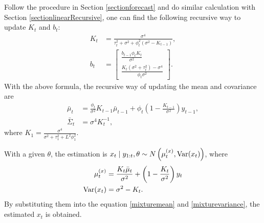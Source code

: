 Follow the procedure in Section \ref{sectionforecast} and do similar calculation with Section \ref{sectionlinearRecursive}, one can find the following recursive way to update $K_{t}$ and $b_{t}$: 
\begin{align} \label{linearOUKirreg}
K_{t}  &=\frac{\sigma^4}{\tau_t^2+\sigma^2+\phi_t^2(\sigma^2-K_{t-1})},\\
b_{t} &= \begin{bmatrix}
\frac{b_{t-1}\phi_t K_{t}}{\sigma^2} \\\label{linearOUbirreg} \frac{K_{t}(\sigma^2+\tau_t^2)-\sigma^4 }{\phi_t\sigma^2}
\end{bmatrix}. 
\end{align}
With the above formula, the recursive way of updating the mean and covariance are 
\begin{align} \label{linearOUmu}
\bar{\mu}_{t}       & = \frac{\phi_t}{\sigma^2}K_{t-1}\bar{\mu}_{t-1} + \phi_t \left(1 - \frac{K_{t-1}}{\sigma^2}\right)y_{t-1}, \\
\bar{\Sigma}_{t}  &= \sigma^4K_{t}^{-1}, \label{linearOUsigma}
\end{align}
where $K_1=\frac{\sigma^4}{\sigma^2+\tau_1^2+L^2\phi_1^2}$. 
%


With a given $\theta$, the estimation is $x_{t}\mid y_{1:t},\theta \sim N\left(\mu_{t}^{(x)},\mathrm{Var}(x_t)\right)$, where
\begin{align}\label{linearOUmean}
\mu_{t}^{(x)} &  =  \frac{K_{t}\bar{\mu}_{t}}{\sigma^2}+\left(1-\frac{K_{t}}{\sigma^2}\right)y_{t} \\ \label{linearOUvar}
\mathrm{Var}(x_t)&= \sigma^2-K_{t}.
\end{align}
By substituting them into the equation \eqref{mixturemean} and \eqref{mixturevariance}, the estimated $x_t$ is obtained. 

